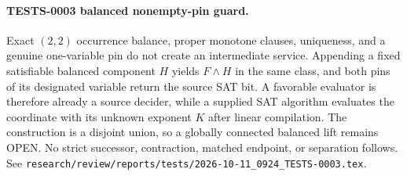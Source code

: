 \paragraph{TESTS-0003 balanced nonempty-pin guard.}
Exact $(2,2)$ occurrence balance, proper monotone clauses, uniqueness, and a
genuine one-variable pin do not create an intermediate service.  Appending a
fixed satisfiable balanced component $H$ yields $F\wedge H$ in the same class,
and both pins of its designated variable return the source SAT bit.  A
favorable evaluator is therefore already a source decider, while a supplied
SAT algorithm evaluates the coordinate with its unknown exponent $K$ after
linear compilation.  The construction is a disjoint union, so a globally
connected balanced lift remains OPEN.  No strict successor, contraction,
matched endpoint, or separation follows.  See
\texttt{research/review/reports/tests/2026-10-11\_0924\_TESTS-0003.tex}.

